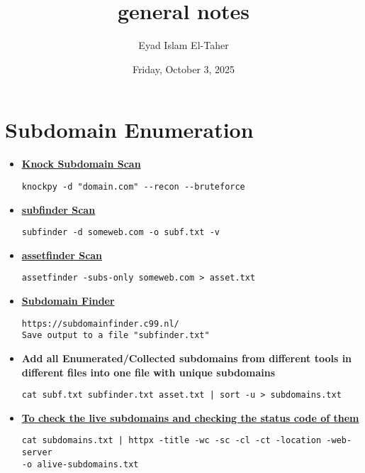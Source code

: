 \documentclass{article}
\title{general notes}
\date{Friday, October 3, 2025}
\author{Eyad Islam El-Taher}
\begin{document}
\maketitle

\section*{Subdomain Enumeration}

\begin{itemize}

\item \textbf{\underline{Knock Subdomain Scan}}
\begin{lstlisting}[frame=single]
knockpy -d "domain.com" --recon --bruteforce
\end{lstlisting}

\item \textbf{\underline{subfinder Scan}}
\begin{lstlisting}[frame=single]
subfinder -d someweb.com -o subf.txt -v
\end{lstlisting}

\item \textbf{\underline{assetfinder Scan}}
\begin{lstlisting}[frame=single]
assetfinder -subs-only someweb.com > asset.txt
\end{lstlisting}

\item \textbf{\underline{Subdomain Finder}}
\begin{lstlisting}[frame=single]
https://subdomainfinder.c99.nl/
Save output to a file "subfinder.txt"
\end{lstlisting}

\item \textbf{Add all Enumerated/Collected subdomains from different tools in different files into one file with unique subdomains}
\begin{lstlisting}[frame=single]
 cat subf.txt subfinder.txt asset.txt | sort -u > subdomains.txt
\end{lstlisting}

\item \textbf{\underline{To check the live subdomains and checking the status code of them}}
\begin{lstlisting}[frame=single]
cat subdomains.txt | httpx -title -wc -sc -cl -ct -location -web-server
-o alive-subdomains.txt
\end{lstlisting}


\end{itemize}
\end{document}
